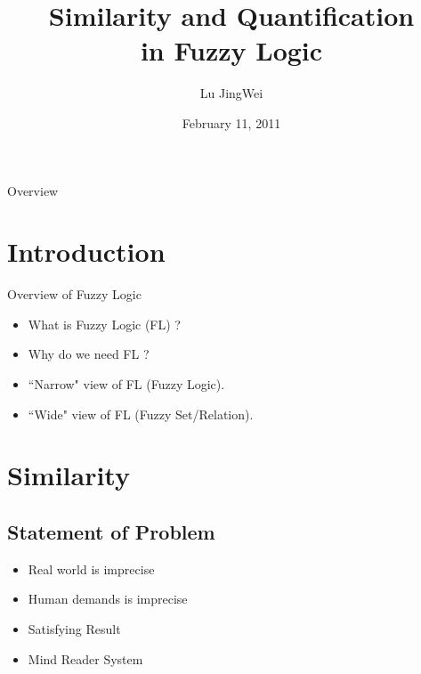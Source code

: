 \documentclass{beamer}
\title[Similarity and Quantification]{Similarity and Quantification \\ in Fuzzy Logic}
\author{Lu JingWei}
\institute{Facultad of Inform\'atica\\
  Universidad Polit\'ecnica de Madrid \\}
\date{February 11, 2011}
\begin{document}
\begin{frame}
\titlepage
\end{frame}

\begin{frame}{Overview}
\tableofcontents
\end{frame}




\section{Introduction}

\begin{frame} {Overview of Fuzzy Logic}
\begin{itemize}
\item What is Fuzzy Logic (FL) ?
\item Why do we need FL ?
\item ``Narrow" view of FL (Fuzzy Logic).
\item ``Wide" view of FL (Fuzzy Set/Relation).
\end{itemize}
\end{frame}

\section{Similarity}

\subsection{Statement of Problem}
\begin{frame}
\begin{itemize}
\item Real world is imprecise
\item Human demands is imprecise
\item Satisfying Result
\item Mind Reader System
\end{itemize}
\end{frame}
\end{document}
